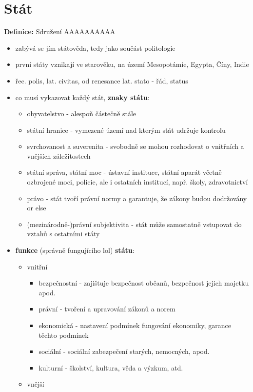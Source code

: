 \documentclass{article}
\begin{document}
\section{Stát}
\textbf{Definice:} Sdružení AAAAAAAAAA
\begin{itemize}
  \item zabývá se jím státověda, tedy jako součást politologie
  \item první státy vznikají ve starověku, na území Mesopotámie, Egypta, Číny, Indie
  \item řec. polis, lat. civitas, od renesance lat. stato - řád, status
  \item co musí vykazovat každý stát, \textbf{znaky státu}:
  \begin{itemize}
    \item obyvatelstvo - alespoň částečně stále
    \item státní hranice - vymezené území nad kterým stát udržuje kontrolu
    \item svrchovanost a suverenita - svobodně se mohou rozhodovat o vnitřních a vnějších záležitostech
    \item státní správa, státní moc - ústavní instituce, státní aparát včetně ozbrojené moci, policie, ale i ostatních institucí, např. školy, zdravotnictví
    \item právo - stát tvoří právní normy a garantuje, že zákony budou dodržovány or else
    \item (mezinárodně-)právní subjektivita - stát může samostatně vstupovat do vztahů s ostatními státy
  \end{itemize}
  \item \textbf{funkce} (správně fungujícího lol) \textbf{státu}:
  \begin{itemize}
    \item vnitřní
    \begin{itemize}
      \item bezpečnostní - zajištuje bezpečnost občanů, bezpečnost jejich majetku apod.
      \item právní - tvoření a upravování zákonů a norem
      \item ekonomická - nastavení podmínek fungování ekonomiky, garance těchto podmínek
      \item sociální - sociální zabezpečení starých, nemocných, apod.
      \item kulturní - školství, kultura, věda a výzkum, atd.
    \end{itemize}
    \item vnější

\end{itemize}
\end{itemize}
\end{document}
